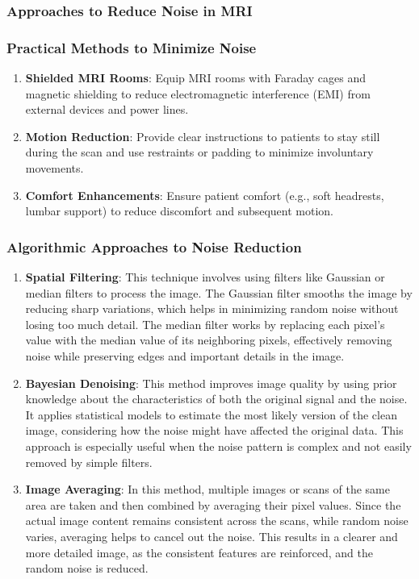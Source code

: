 \documentclass[hidelinks,12pt]{article}
\begin{document}
	
	\subsubsection{Approaches to Reduce Noise in MRI}
	
	\subsubsection*{Practical Methods to Minimize Noise}
	\begin{enumerate}
		\item \textbf{Shielded MRI Rooms}: Equip MRI rooms with Faraday cages and magnetic shielding to reduce electromagnetic interference (EMI) from external devices and power lines.
		
		\item \textbf{Motion Reduction}: Provide clear instructions to patients to stay still during the scan and use restraints or padding to minimize involuntary movements.
		
		\item \textbf{Comfort Enhancements}: Ensure patient comfort (e.g., soft headrests, lumbar support) to reduce discomfort and subsequent motion.
		
	\end{enumerate}
	
	\subsubsection*{Algorithmic Approaches to Noise Reduction}
	
	\begin{enumerate}
		\item \textbf{Spatial Filtering}: This technique involves using filters like Gaussian or median filters to process the image. The Gaussian filter smooths the image by reducing sharp variations, which helps in minimizing random noise without losing too much detail. The median filter works by replacing each pixel's value with the median value of its neighboring pixels, effectively removing noise while preserving edges and important details in the image.
		
		\item \textbf{Bayesian Denoising}: This method improves image quality by using prior knowledge about the characteristics of both the original signal and the noise. It applies statistical models to estimate the most likely version of the clean image, considering how the noise might have affected the original data. This approach is especially useful when the noise pattern is complex and not easily removed by simple filters.
		
		\item \textbf{Image Averaging}: In this method, multiple images or scans of the same area are taken and then combined by averaging their pixel values. Since the actual image content remains consistent across the scans, while random noise varies, averaging helps to cancel out the noise. This results in a clearer and more detailed image, as the consistent features are reinforced, and the random noise is reduced.
	\end{enumerate}
	
\end{document}
